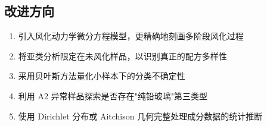 \subsection{改进方向}

\begin{enumerate}[label=(\arabic*)]
    \item 引入风化动力学微分方程模型，更精确地刻画多阶段风化过程
    \item 将亚类分析限定在未风化样品，以识别真正的配方多样性
    \item 采用贝叶斯方法量化小样本下的分类不确定性
    \item 利用 A2 异常样品探索是否存在"纯铅玻璃"第三类型
    \item 使用 Dirichlet 分布或 Aitchison 几何完整处理成分数据的统计推断
\end{enumerate}
